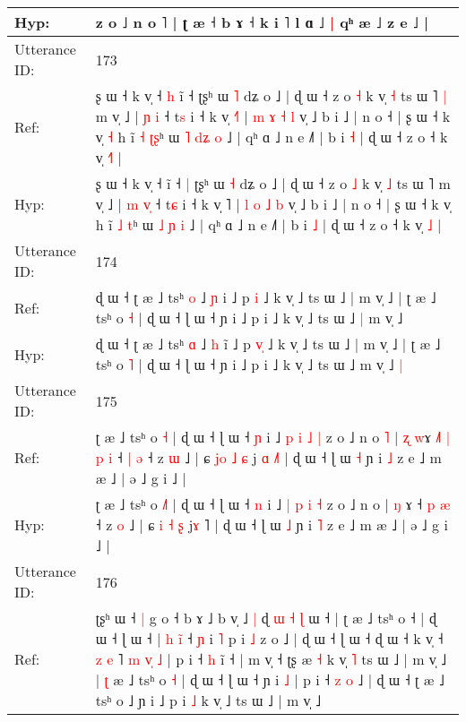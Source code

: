 \documentclass[10pt]{article}
\DeclareRobustCommand{\hl}[1]{{\textcolor{red}{#1}}}
\begin{document}
\begin{longtable}{ll}
 \\
Hyp: & z o ˩ n o ˥ | ʈ æ ˧ b ɤ ˧ k i ˥ l ɑ ˩\hl{ }\hl{|} qʰ æ ˩ z e ˩ |
 \\
\midrule
Utterance ID: & 173 \\
Ref: & ʂ ɯ ˧ k v̩ ˧\hl{ }\hl{h} ĩ ˧\hl{}\hl{} ʈʂʰ ɯ \hl{˥} dʑ o ˩ | ɖ ɯ ˧ z o \hl{˧} k v̩ \hl{˧} ts ɯ ˥\hl{ }\hl{|} m v̩ ˩ | \hl{ɲ} \hl{}\hl{i} ˧ t\hl{s} i ˧ k v̩ \hl{˧}˥ | \hl{m} \hl{ɤ} \hl{˧} \hl{l} v̩ ˩ b i ˩ | n o ˧ | ʂ ɯ ˧ k v̩\hl{ }\hl{˧} h ĩ \hl{˧} \hl{ʈ}\hl{ʂ}ʰ ɯ \hl{˥} \hl{d}\hl{ʑ} \hl{o} ˩ | qʰ ɑ ˩ n e ˩˥ | b i \hl{˧} | ɖ ɯ ˧ z o ˧ k v̩ \hl{˧}\hl{˥} |
 \\
Hyp: & ʂ ɯ ˧ k v̩ ˧\hl{}\hl{} ĩ ˧\hl{ }\hl{|} ʈʂʰ ɯ \hl{˧} dʑ o ˩ | ɖ ɯ ˧ z o \hl{˩} k v̩ \hl{˩} ts ɯ ˥\hl{}\hl{} m v̩ ˩ | \hl{m} \hl{v}\hl{̩} ˧ t\hl{ɕ} i ˧ k v̩ \hl{}˥ | \hl{l} \hl{o} \hl{˩} \hl{b} v̩ ˩ b i ˩ | n o ˧ | ʂ ɯ ˧ k v̩\hl{}\hl{} h ĩ \hl{˩} \hl{}\hl{t}ʰ ɯ \hl{˩} \hl{}\hl{ɲ} \hl{i} ˩ | qʰ ɑ ˩ n e ˩˥ | b i \hl{˩} | ɖ ɯ ˧ z o ˧ k v̩ \hl{}\hl{˩} |
 \\
\midrule
Utterance ID: & 174 \\
Ref: & ɖ ɯ ˧ ʈ æ ˩ tsʰ \hl{o} ˩ \hl{ɲ} i\hl{} ˩ p \hl{}\hl{i} ˩ k v̩ ˩ ts ɯ ˩ | m v̩ ˩ | ʈ æ ˩ tsʰ o \hl{˧} | ɖ ɯ ˧ ɭ ɯ ˧ ɲ i ˩ p i ˩ k v̩ ˩ ts ɯ ˩\hl{ }\hl{|} m v̩ ˩\hl{}\hl{}
 \\
Hyp: & ɖ ɯ ˧ ʈ æ ˩ tsʰ \hl{ɑ} ˩ \hl{h} i\hl{̃} ˩ p \hl{v}\hl{̩} ˩ k v̩ ˩ ts ɯ ˩ | m v̩ ˩ | ʈ æ ˩ tsʰ o \hl{˥} | ɖ ɯ ˧ ɭ ɯ ˧ ɲ i ˩ p i ˩ k v̩ ˩ ts ɯ ˩\hl{}\hl{} m v̩ ˩\hl{ }\hl{|}
 \\
\midrule
Utterance ID: & 175 \\
Ref: & ʈ æ ˩ tsʰ o \hl{}\hl{˧} | ɖ ɯ ˧ ɭ ɯ ˧ \hl{ɲ} i ˩ \hl{p} \hl{i} \hl{˩} \hl{|} z o ˩ n o\hl{ }\hl{˥} | \hl{ʐ} \hl{w}ɤ\hl{ }\hl{˩}\hl{˥}\hl{ }\hl{|}\hl{ }\hl{p}\hl{ }\hl{i} ˧ \hl{|} \hl{ə} ˧ z \hl{ɯ} ˩ | ɕ \hl{j}\hl{o} \hl{˩} \hl{ɕ} j\hl{ }\hl{ɑ} \hl{˩}˥ | ɖ ɯ ˧ ɭ ɯ \hl{˧} ɲ i \hl{˩} z e ˩ m æ ˩ | ə ˩ g i ˩ |
 \\
Hyp: & ʈ æ ˩ tsʰ o \hl{˩}\hl{˥} | ɖ ɯ ˧ ɭ ɯ ˧ \hl{n} i ˩ \hl{|} \hl{p} \hl{i} \hl{˧} z o ˩ n o\hl{}\hl{} | \hl{ŋ} \hl{}ɤ\hl{}\hl{}\hl{}\hl{}\hl{}\hl{}\hl{}\hl{}\hl{} ˧ \hl{p} \hl{æ} ˧ z \hl{o} ˩ | ɕ \hl{}\hl{i} \hl{˧} \hl{ʂ} j\hl{}\hl{ɤ} \hl{}˥ | ɖ ɯ ˧ ɭ ɯ \hl{˩} ɲ i \hl{˥} z e ˩ m æ ˩ | ə ˩ g i ˩ |
 \\
\midrule
Utterance ID: & 176 \\
Ref: & ʈʂʰ ɯ ˧\hl{ }\hl{|} g o ˧ b ɤ ˩ b v̩ ˩\hl{ }\hl{|} ɖ\hl{ }\hl{ɯ}\hl{ }\hl{˧}\hl{ }\hl{ɭ} ɯ ˧ | ʈ æ ˩ tsʰ o ˧\hl{} | ɖ ɯ ˧ ɭ ɯ ˧ | \hl{h} \hl{i}\hl{̃} ˧ \hl{ɲ} i\hl{}\hl{} \hl{˥} p i \hl{˩} z o ˩ | ɖ ɯ\hl{}\hl{} ˧ ɭ ɯ ˧ ɖ ɯ ˧ k\hl{} v̩ ˧\hl{ }\hl{z}\hl{ }\hl{e}\hl{ }˥\hl{ }\hl{m}\hl{ }\hl{v}\hl{̩}\hl{ }\hl{˩} | p i ˧ \hl{h} i\hl{̃} ˧ | m v̩ ˧ ʈʂ æ \hl{˧} k v̩ \hl{˥} ts ɯ ˩ | m v̩ ˩ | \hl{ʈ} æ ˩ tsʰ o \hl{}\hl{˧} | ɖ ɯ ˧ ɭ ɯ ˧ ɲ i \hl{˩} | p i ˧ \hl{}\hl{z} \hl{o} ˩ | ɖ ɯ ˧ ʈ æ ˩ tsʰ o ˩ ɲ i ˩ p i \hl{˩} k v̩ ˩ ts ɯ ˩ | m v̩ ˩

\end{longtable}
\end{document}
